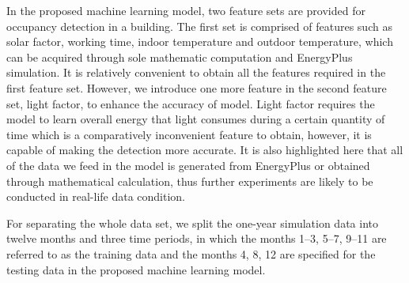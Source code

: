 \textcolor{feb18rev}{In the proposed machine learning model, two feature sets
are provided for occupancy detection in a building. The first set is comprised
of features such as solar factor, working time, indoor temperature and outdoor
temperature, which can be acquired through sole mathematic computation and
EnergyPlus simulation.} It is relatively convenient to obtain all the features
required in the first feature set. However, we introduce one more feature in
the second feature set, light factor, to enhance the accuracy of model. Light
factor requires the model to learn overall energy that light consumes during a
certain quantity of time which is a comparatively inconvenient feature to
obtain, however, it is capable of making the detection more accurate. It is
also highlighted here that all of the data we feed in the model is generated
from EnergyPlus or obtained through mathematical calculation, thus further
experiments are likely to be conducted in real-life data condition.

For separating the whole data set, we split the one-year simulation
data into twelve months and three time periods, in which the months
1--3, 5--7, 9--11 are referred to as the training data and the months 4,
8, 12 are specified for the testing data in the proposed machine
learning model.
